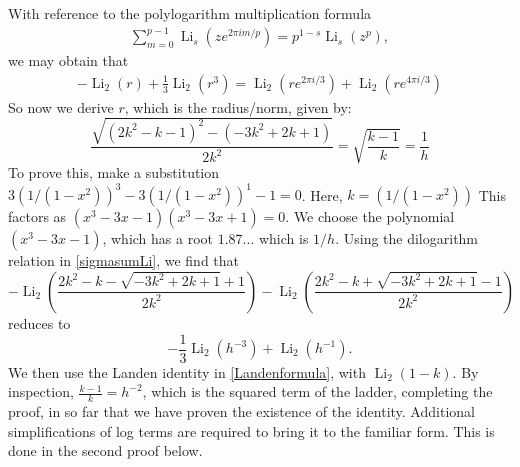 \documentclass[12pt]{article}
\begin{document}
 With reference to the polylogarithm multiplication formula 
\begin{equation}\label{previously11p4}
\begin{aligned}
 \sum_{m=0}^{p-1} \operatorname{Li}_s(z e^{2\pi i m/p}) = p^{1-s} \operatorname{Li}_s(z^p), 
\end{aligned}
\end{equation}
 we may obtain that 
\begin{equation}\label{previously11p5}
\begin{aligned}
 -\operatorname{Li}_2(r) + \frac{1}{3} \operatorname{Li}_2(r^3) = 
 \operatorname{Li}_2\left(r e^{2\pi i / 3}\right)+\operatorname{Li}_2\left(r e^{4\pi i / 3}\right) 
\end{aligned}
\end{equation}
 So now we derive $r$, which is the radius/norm, given by: 
\begin{equation*}
\frac{\sqrt{(2 k^2 - k - 1)^2 - (-3 k^2 + 2 k + 1)}}{2 k^2} = \sqrt{\frac{k - 1}{k}}=\frac{1}{h}
\end{equation*}
 To prove this, make a substitution $3 (1/(1-x^2))^3 - 3 (1/(1-x^2))^1 - 1 =0$. Here, $k= (1/(1-x^2))$ This factors
 as $(x^3 - 3 x - 1) (x^3 - 3 x + 1) = 0$. We choose the polynomial $(x^3 - 3 x - 1) $, which has a root $1.87...$ which is $1/h$. 
 Using the dilogarithm relation in \eqref{sigmasumLi}, we find that 
\begin{equation}\label{previously11p7}
 - \operatorname{Li}_2\left(\frac{2 k^2 - k- \sqrt{-3 k^2 + 2 k + 1} + 1}{2 k^2}\right) 
 - \operatorname{Li}_2\left(\frac{2 k^2 - k + \sqrt{-3 k^2 + 2 k + 1} - 1}{2 k^2}\right) 
\end{equation}
 reduces to $$ -\frac{1}{3} \operatorname{Li}_2(h^{-3}) + \operatorname{Li}_2(h^{-1}).$$ We then use the Landen identity in 
 \eqref{Landenformula}, with $\operatorname{Li}_2(1-k)$. By inspection, $\frac{k-1}{k} = h^{-2}$, which is the squared term of the 
 ladder, completing the proof, in so far that we have proven the existence of the identity. Additional simplifications of log terms are 
 required to bring it to the familiar form. This is done in the second proof below. 
\end{document}
